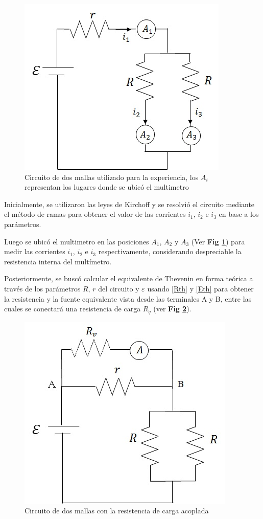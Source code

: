 \documentclass[11pt,a4paper]{article}
\begin{document}
\begin{figure}[h]
  \centering
  \includegraphics[scale=0.55]{Mallas_sin_carga}
  \caption{Circuito de dos mallas utilizado para la experiencia, los $A_i$ representan los lugares donde se ubicó el multimetro}
  \label{fig:circ_mallas}
\end{figure}

Inicialmente, se utilizaron las leyes de Kirchoff y se resolvió el circuito mediante el método de ramas para obtener el valor de las corrientes $i_1$, $i_2$ e $i_3$ en base a los parámetros. 
 
Luego se ubicó el multimetro en las posiciones $A_1$, $A_2$ y $A_3$ (Ver \textbf{Fig \ref{fig:circ_mallas}}) para medir las corrientes $i_1$, $i_2$ e $i_3$ respectivamente, considerando despreciable la resistencia interna del multímetro.
 
Posteriormente, se buscó calcular el equivalente de Thevenin en forma teórica a través de los parámetros $R$, $r$ del circuito y $\varepsilon$ usando \eqref{Rth} y \eqref{Eth} para obtener la resistencia y la fuente equivalente vista desde las terminales A y B, entre las cuales se conectará una resistencia de carga $R_q$ (ver \textbf{Fig \ref{fig:circ_mallas_carga}}). 

\begin{figure}[h]
  \centering
  \includegraphics[scale=0.55]{Mallas_con_carga}
  \caption{Circuito de dos mallas con la resistencia de carga acoplada}
  \label{fig:circ_mallas_carga}
\end{figure}
\end{document}

